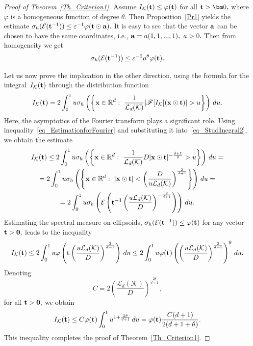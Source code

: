 \documentclass[12pt]{article}
\begin{document}
\begin{proof}[Proof of Theorem~\ref{Th_Criterion1}]
Assume ${I_{\mathcal{K}}({\bf t})\leq \varphi({\bf t})}$ for all ${\bf t}>{\bm0},$ where $\varphi$ is a homogeneous function of degree $\theta.$ Then Proposition~\ref{Pr1} yields the estimate
$\sigma_h(\mathcal{E}({\bf t}^{-1}))\leq\varepsilon^{-1}\varphi({\bf t}\odot{\bf a}).$ It is easy to see that the vector ${\bf a}$ can be chosen to have the same coordinates, i.e., ${{\bf a}=a(1,1,...,1)},\ a>0.$ Then from homogeneity we get
$$
\sigma_h(\mathcal{E}({\bf t}^{-1}))\leq\varepsilon^{-2}a^\theta\varphi({\bf t}).
$$

Let us now prove the implication in the other direction, using the formula for the integral~${I_{\mathcal{K}}(\bf t)}$ through the distribution function
\begin{equation}\label{eq_StudInegral2}
I_{\mathcal{K}}({\bf t})=2\int_0^1u\sigma_h\left(\left\{{\bf x}\in\mathbb{R}^d:\ \frac{1}{\mathcal{L}_d(\mathcal{K})}|\mathscr{F}[I_{\mathcal{K}}]({\bf x}\odot{\bf t})|>u\right\}\right)\,du.
\end{equation}
Here, the asymptotics of the Fourier transform plays a significant role. Using  inequality~\eqref{eq_EstimationforFourier} and substituting it into~\eqref{eq_StudInegral2}, we obtain the estimate
\begin{multline*}
I_{\mathcal{K}}({\bf t})\leq2\int_0^1u\sigma_h\left(\left\{{\bf x}\in\mathbb{R}^d:\ \frac{1}{\mathcal{L}_d(\mathcal{K})}D|{\bf x}\odot{\bf t}|^{-\frac{d+1}{2}}>u\right\}\right)\,du=\\
=2\int_0^1u\sigma_h\left(\left\{{\bf x}\in\mathbb{R}^d:\ |{\bf x}\odot{\bf t}|<\left(\frac{D}{u\mathcal{L}_d(\mathcal{K})}\right)^{\frac{2}{d+1}}\right\}\right)\,du=\\
=2\int_0^1u\sigma_h\left(\mathcal{E}\left({\bf t}^{-1}\left(\frac{u\mathcal{L}_d(\mathcal{K})}{D}\right)^{-\frac{2}{d+1}}\right)\right)\,du.
\end{multline*}
Estimating the spectral measure on ellipsoids, ${\sigma_h(\mathcal{E}({\bf t}^{-1}))\leq\varphi({\bf t})}$ for any vector ${{\bf t}>\bf0},$ leads to the inequality
$$
I_{\mathcal{K}}({\bf t})\leq2\int_0^1u\varphi\left({\bf t}\left(\frac{u\mathcal{L}_d(\mathcal{K})}{D}\right)^{\frac{2}{d+1}}\right)\,du\leq
2\int_0^1u\varphi({\bf t})\left(\left(\frac{u\mathcal{L}_d(\mathcal{K})}{D}\right)^{\frac{2}{d+1}}\right)^\theta\,du.
$$
Denoting
$$
C=2\left(\frac{\mathcal{L}_d(\mathcal{K})}{D}\right)^{\frac{2\theta}{d+1}},
$$
for all ${{\bf t}>\bf0},$ we obtain
$$
I_{\mathcal{K}}({\bf t})\leq
C\varphi({\bf t})\int_0^1u^{1+\frac{2\theta}{d+1}}\,du=\varphi({\bf t})\frac{C(d+1)}{2(d+1+\theta)}.
$$
This inequality completes the proof of Theorem~\ref{Th_Criterion1}.
\end{proof}
\end{document}

